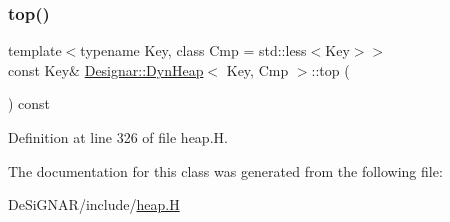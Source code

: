 \subsubsection{\texorpdfstring{top()}{top()}}
{\footnotesize\ttfamily template$<$typename Key, class Cmp = std\+::less$<$\+Key$>$$>$ \\
const Key\& \hyperlink{class_designar_1_1_dyn_heap}{Designar\+::\+Dyn\+Heap}$<$ Key, Cmp $>$\+::top (\begin{DoxyParamCaption}{ }\end{DoxyParamCaption}) const\hspace{0.3cm}{\ttfamily [inline]}}



Definition at line 326 of file heap.\+H.



The documentation for this class was generated from the following file\+:\begin{DoxyCompactItemize}
\item 
De\+Si\+G\+N\+A\+R/include/\hyperlink{heap_8_h}{heap.\+H}\end{DoxyCompactItemize}
